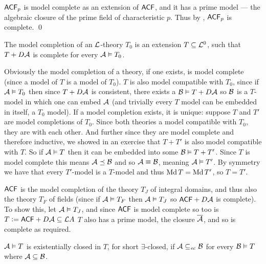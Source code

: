 ${\sf ACF}_p$ is model complete as an extension of ${\sf ACF}$, and it has a prime model --- the algebraic closure of the prime field of characteristic $p$.
Thus by , ${\sf ACF}_p$ is complete.
\qed

\bdefn

    The {\emphcolor model completion} of an ${\cal L}$-theory $T_0$ is an extension $T\subseteq{\cal L}^0$, such that $T+D{\cal A}$ is complete for every ${\cal A}\vDash T_0$.

\edefn

Obviously the model completion of a theory, if one exists, is model complete (since a model of $T$ is a model of $T_0$).
$T$ is also model compatible with $T_0$, since if ${\cal A}\vDash T_0$ then since $T+D{\cal A}$ is consistent, there exists a ${\cal B}\vDash T+D{\cal A}$ so ${\cal B}$ is a $T$-model in which one can embed
${\cal A}$ (and trivially every $T$ model can be embedded in itself, a $T_0$ model).
If a model completion exists, it is unique: suppose $T$ and $T'$ are model completions of $T_0$.
Since both theories a model compatible with $T_0$, they are with each other.
And further since they are model complete and therefore inductive, we showed in an exercise that $T+T'$ is also model compatible with $T$.
So if ${\cal A}\vDash T$ then it can be embedded into some ${\cal B}\vDash T+T'$.
Since $T$ is model complete this means ${\cal A}\preceq{\cal B}$ and so ${\cal A}\equiv{\cal B}$, meaning ${\cal A}\vDash T'$.
By symmetry we have that every $T'$-model is a $T$-model and thus $\Md T=\Md T'$, so $T=T'$.

\bexam

    ${\sf ACF}$ is the model completion of the theory $T_J$ of integral domains, and thus also the theory $T_F$ of fields (since if ${\cal A}\vDash T_F$ then ${\cal A}\vDash T_J$ so ${\sf ACF}+D{\cal A}$ is
    complete).
    To show this, let ${\cal A}\vDash T_J$, and since ${\sf ACF}$ is model complete so too is $T\coloneqq{\sf ACF}+D{\cal A}\subseteq{\cal L}A$
    $T$ also has a prime model, the closure $\overline{{\cal A}}$, and so is complete as required.

\eexam

\bdefn

    ${\cal A}\vDash T$ is {\emphcolor existentially closed} in $T$, for short $\exists$-closed, if ${\cal A}\subseteq_{\it ec}{\cal B}$ for every ${\cal B}\vDash T$
    where ${\cal A}\subseteq{\cal B}$.

